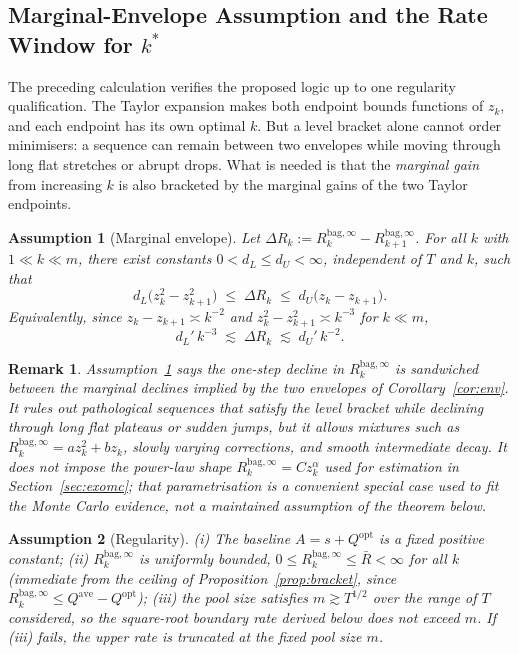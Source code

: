 \documentclass[12pt,a4paper]{article}
\newtheorem{remark}{Remark}
\newtheorem{assumption}{Assumption}
\theoremstyle{definition}
\newcommand{\Qopt}{Q^{\mathrm{opt}}}
\newcommand{\Qave}{Q^{\mathrm{ave}}}
\newcommand{\Rk}{R_k^{\mathrm{bag},\infty}}
\begin{document}
\subsection{Marginal-Envelope Assumption and the Rate Window for $k^*$}
\label{sec:marginal}

The preceding calculation verifies the proposed logic up to one regularity
qualification.  The Taylor expansion makes both endpoint bounds functions
of $z_k$, and each endpoint has its own optimal $k$.  But a level bracket
alone cannot order minimisers: a sequence can remain between two envelopes
while moving through long flat stretches or abrupt drops.  What is needed is
that the \emph{marginal gain} from increasing $k$ is also bracketed by the
marginal gains of the two Taylor endpoints.

\begin{assumption}[Marginal envelope]\label{ass:marginal}
Let $\Delta R_k := \Rk - R_{k+1}^{\mathrm{bag},\infty}$.  For all $k$ with
$1\ll k\ll m$, there exist constants $0<d_L\le d_U<\infty$, independent of
$T$ and $k$, such that
\begin{equation}\label{eq:marginal}
  d_L\bigl(z_k^2-z_{k+1}^2\bigr) \;\le\; \Delta R_k \;\le\; d_U\bigl(z_k-z_{k+1}\bigr).
\end{equation}
Equivalently, since $z_k-z_{k+1}\asymp k^{-2}$ and $z_k^2-z_{k+1}^2\asymp
k^{-3}$ for $k\ll m$,
\begin{equation*}
  d_L'\,k^{-3} \;\lesssim\; \Delta R_k \;\lesssim\; d_U'\,k^{-2}.
\end{equation*}
\end{assumption}

\begin{remark}
Assumption~\ref{ass:marginal} says the one-step decline in $\Rk$ is
sandwiched between the marginal declines implied by the two envelopes of
Corollary~\ref{cor:env}.  It rules out pathological sequences that satisfy
the level bracket while declining through long flat plateaus or sudden
jumps, but it allows mixtures such as $\Rk=az_k^2+bz_k$, slowly varying
corrections, and smooth intermediate decay.  It does \emph{not} impose the
power-law shape $\Rk=Cz_k^\alpha$ used for estimation in
Section~\ref{sec:exomc}; that parametrisation is a convenient special case
used to fit the Monte Carlo evidence, not a maintained assumption of the
theorem below.
\end{remark}

\begin{assumption}[Regularity]\label{ass:regularity}
(i) The baseline $A=s+\Qopt$ is a fixed positive constant; (ii) $\Rk$ is
uniformly bounded, $0\le\Rk\le\bar R<\infty$ for all $k$ (immediate from
the ceiling of Proposition~\ref{prop:bracket}, since $\Rk\le\Qave-\Qopt$);
(iii) the pool size satisfies $m\gtrsim T^{1/2}$ over the range of $T$
considered, so the square-root boundary rate derived below does not exceed
$m$.  If (iii) fails, the upper rate is truncated at the fixed pool size $m$.
\end{assumption}
\end{document}
